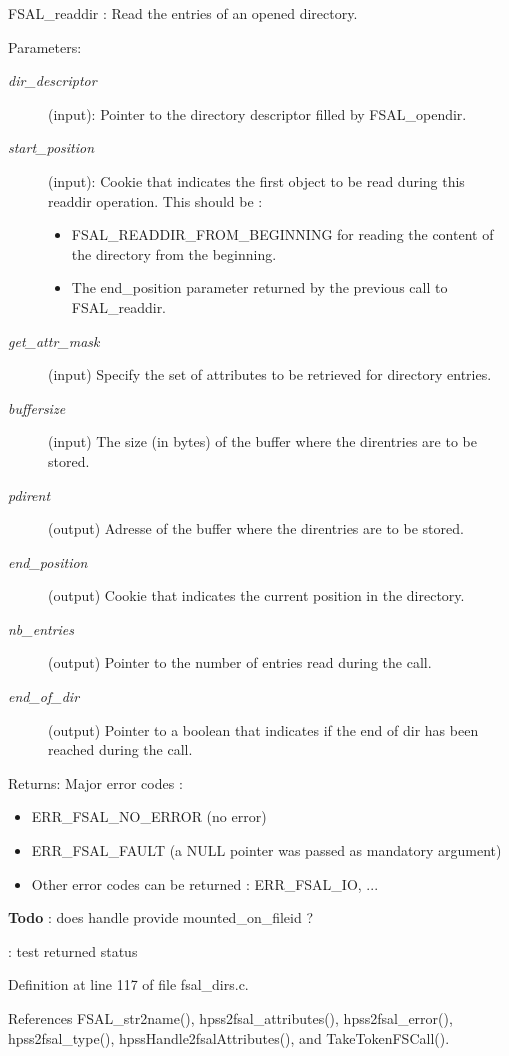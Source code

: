 FSAL\_\-readdir : Read the entries of an opened directory.

\begin{Desc}
\item[Parameters:]
\begin{description}
\item[{\em dir\_\-descriptor}](input): Pointer to the directory descriptor filled by FSAL\_\-opendir. \item[{\em start\_\-position}](input): Cookie that indicates the first object to be read during this readdir operation. This should be :\begin{itemize}
\item FSAL\_\-READDIR\_\-FROM\_\-BEGINNING for reading the content of the directory from the beginning.\item The end\_\-position parameter returned by the previous call to FSAL\_\-readdir. \end{itemize}
\item[{\em get\_\-attr\_\-mask}](input) Specify the set of attributes to be retrieved for directory entries. \item[{\em buffersize}](input) The size (in bytes) of the buffer where the direntries are to be stored. \item[{\em pdirent}](output) Adresse of the buffer where the direntries are to be stored. \item[{\em end\_\-position}](output) Cookie that indicates the current position in the directory. \item[{\em nb\_\-entries}](output) Pointer to the number of entries read during the call. \item[{\em end\_\-of\_\-dir}](output) Pointer to a boolean that indicates if the end of dir has been reached during the call.\end{description}
\end{Desc}
\begin{Desc}
\item[Returns:]Major error codes :\begin{itemize}
\item ERR\_\-FSAL\_\-NO\_\-ERROR (no error)\item ERR\_\-FSAL\_\-FAULT (a NULL pointer was passed as mandatory argument)\item Other error codes can be returned : ERR\_\-FSAL\_\-IO, ...\end{itemize}
\end{Desc}


\begin{Desc}
\item[{\bf Todo}]: does handle provide mounted\_\-on\_\-fileid ? 

: test returned status\end{Desc}


Definition at line 117 of file fsal\_\-dirs.c.

References FSAL\_\-str2name(), hpss2fsal\_\-attributes(), hpss2fsal\_\-error(), hpss2fsal\_\-type(), hpss\-Handle2fsal\-Attributes(), and Take\-Token\-FSCall().